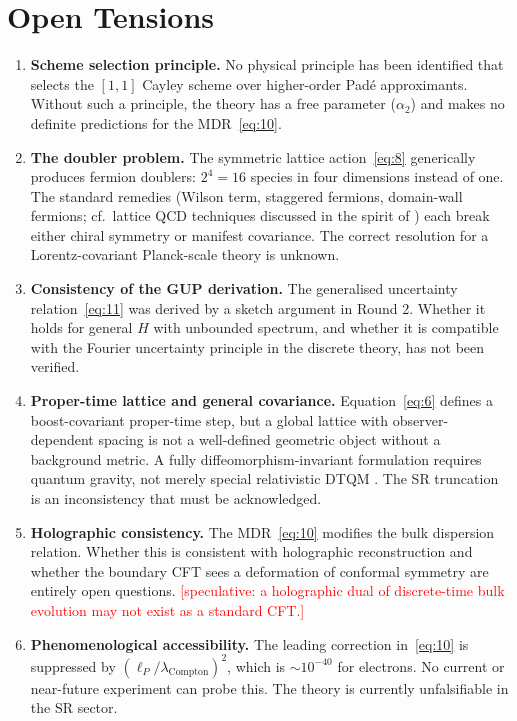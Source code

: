 \documentclass[11pt,a4paper]{article}
\begin{document}
\section{Open Tensions}

\begin{enumerate}
  \item \textbf{Scheme selection principle.} No physical principle has been identified that selects the $[1,1]$ Cayley scheme over higher-order Pad\'{e} approximants. Without such a principle, the theory has a free parameter ($\alpha_2$) and makes no definite predictions for the MDR~\eqref{eq:10}.

  \item \textbf{The doubler problem.} The symmetric lattice action~\eqref{eq:8} generically produces fermion doublers: $2^4 = 16$ species in four dimensions instead of one. The standard remedies (Wilson term, staggered fermions, domain-wall fermions; cf.\ lattice QCD techniques discussed in the spirit of \cite{thiemann1996}) each break either chiral symmetry or manifest covariance. The correct resolution for a Lorentz-covariant Planck-scale theory is unknown.

  \item \textbf{Consistency of the GUP derivation.} The generalised uncertainty relation~\eqref{eq:11} was derived by a sketch argument in Round 2. Whether it holds for general $H$ with unbounded spectrum, and whether it is compatible with the Fourier uncertainty principle in the discrete theory, has not been verified.

  \item \textbf{Proper-time lattice and general covariance.} Equation~\eqref{eq:6} defines a boost-covariant proper-time step, but a global lattice with observer-dependent spacing is not a well-defined geometric object without a background metric. A fully diffeomorphism-invariant formulation requires quantum gravity, not merely special relativistic DTQM \cite{ashtekar2004, thiemann1996}. The SR truncation is an inconsistency that must be acknowledged.

  \item \textbf{Holographic consistency.} The MDR~\eqref{eq:10} modifies the bulk dispersion relation. Whether this is consistent with holographic reconstruction \cite{maldacena1997, witten1998, skenderis2002} and whether the boundary CFT sees a deformation of conformal symmetry are entirely open questions. \textcolor{red}{[speculative: a holographic dual of discrete-time bulk evolution may not exist as a standard CFT.]}

  \item \textbf{Phenomenological accessibility.} The leading correction in~\eqref{eq:10} is suppressed by $(\ell_P/\lambda_\mathrm{Compton})^2$, which is $\sim 10^{-40}$ for electrons. No current or near-future experiment can probe this. The theory is currently unfalsifiable in the SR sector.
\end{enumerate}
\end{document}
